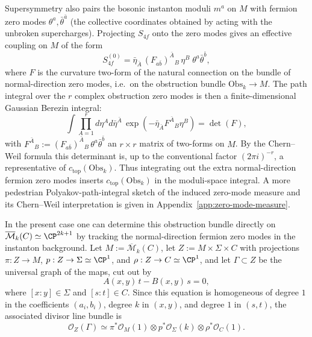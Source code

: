 \documentclass[12pt]{article}
\begin{document}
Supersymmetry also pairs the bosonic instanton moduli $m^a$ on $M$ with fermion
zero modes $\theta^a,\bar\theta^{\bar a}$ (the collective coordinates obtained
by acting with the unbroken supercharges). Projecting $S_{4f}$ onto the zero
modes gives an effective coupling on $M$ of the form
\begin{equation*}
  S_{4f}^{(0)}=\bar\eta_{\bar A}\,(F_{a\bar b})^{\bar A}{}_B\,\eta^B\;\theta^a\bar\theta^{\bar b},
\end{equation*}
where $F$ is the curvature two-form of the natural connection on the bundle of
normal-direction zero modes, i.e.\ on the obstruction bundle
$\mathrm{Obs}_k\to M$. The path integral over the $r$ complex obstruction zero
modes is then a finite-dimensional Gaussian Berezin integral:
\begin{equation*}
  \int \prod_{A=1}^r d\eta^A d\bar\eta^{\bar A}\,
  \exp\!\left(-\bar\eta_{\bar A}F^{\bar A}{}_B\eta^B\right)
  = \det(F),
\end{equation*}
with $F^{\bar A}{}_B:=(F_{a\bar b})^{\bar A}{}_B\,\theta^a\bar\theta^{\bar b}$
an $r\times r$ matrix of two-forms on $M$. By the
Chern--Weil formula this determinant is, up to the conventional factor
$(2\pi i)^{-r}$, a representative of $c_{\mathrm{top}}(\mathrm{Obs}_k)$. Thus
integrating out the extra normal-direction fermion zero modes inserts
$c_{\mathrm{top}}(\mathrm{Obs}_k)$ in the moduli-space integral. A more
pedestrian Polyakov-path-integral sketch of the induced zero-mode measure and
its Chern--Weil interpretation is given in
Appendix~\ref{app:zero-mode-measure}.

In the present case one can determine this obstruction bundle directly on
$\overline{\mathcal{M}}_k(C)\simeq\CP^{2k+1}$ by tracking the normal-direction
fermion zero modes in the instanton background. Let $M:=\overline{\mathcal{M}}_k(C)$,
let $Z:=M\times \Sigma\times C$ with projections $\pi:Z\to M$,
$p:Z\to\Sigma\simeq\CP^1$, and $\rho:Z\to C\simeq\CP^1$, and let
$\Gamma\subset Z$ be the universal graph of the maps, cut out by
\begin{equation*}
  A(x,y)\,t - B(x,y)\,s = 0,
\end{equation*}
where $[x:y]\in\Sigma$ and $[s:t]\in C$. Since this equation is homogeneous of
degree $1$ in the coefficients $(a_i,b_i)$, degree $k$ in $(x,y)$, and degree $1$
in $(s,t)$, the associated divisor line bundle is
\begin{equation*}
  \mathcal{O}_Z(\Gamma)\simeq \pi^*\mathcal{O}_M(1)\otimes p^*\mathcal{O}_\Sigma(k)\otimes \rho^*\mathcal{O}_C(1).
\end{equation*}
\end{document}
